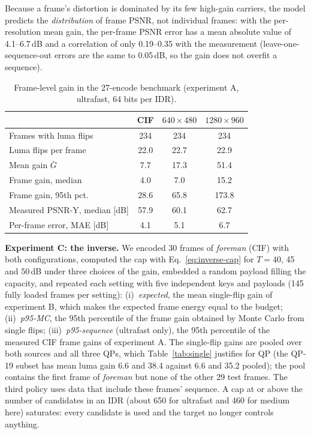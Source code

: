 Because a frame's distortion is dominated by its few high-gain carriers, the model predicts the \emph{distribution} of frame PSNR, not individual frames: with the per-resolution mean gain, the per-frame PSNR error has a mean absolute value of 4.1--6.7\,dB and a correlation of only 0.19--0.35 with the measurement (leave-one-sequence-out errors are the same to 0.05\,dB, so the gain does not overfit a sequence).

\begin{table}[t]
\centering
\caption{Frame-level gain in the 27-encode benchmark (experiment A, ultrafast, 64 bits per IDR).}
\label{tab:sequence}
\setlength{\tabcolsep}{4pt}
\begin{tabular}{@{}lccc@{}}
\toprule
& CIF & $640\times480$ & $1280\times960$ \\
\midrule
Frames with luma flips & 234 & 234 & 234 \\
Luma flips per frame & 22.0 & 22.7 & 22.9 \\
Mean gain $\bar G$ & 7.7 & 17.3 & 51.4 \\
Frame gain, median & 4.0 & 7.0 & 15.2 \\
Frame gain, 95th pct. & 28.6 & 65.8 & 173.8 \\
Measured PSNR-Y, median [dB] & 57.9 & 60.1 & 62.7 \\
Per-frame error, MAE [dB] & 4.1 & 5.1 & 6.7 \\
\bottomrule
\end{tabular}
\end{table}

\textbf{Experiment C: the inverse.} We encoded 30 frames of \emph{foreman} (CIF) with both configurations, computed the cap with Eq.~\eqref{eq:inverse-cap} for $T=40$, 45 and 50\,dB under three choices of the gain, embedded a random payload filling the capacity, and repeated each setting with five independent keys and payloads (145 fully loaded frames per setting): (i)~\emph{expected}, the mean single-flip gain of experiment B, which makes the expected frame energy equal to the budget; (ii)~\emph{p95-MC}, the 95th percentile of the frame gain obtained by Monte Carlo from single flips; (iii)~\emph{p95-sequence} (ultrafast only), the 95th percentile of the measured CIF frame gains of experiment A. The single-flip gains are pooled over both sources and all three QPs, which Table~\ref{tab:single} justifies for QP (the QP-19 subset has mean luma gain 6.6 and 38.4 against 6.6 and 35.2 pooled); the pool contains the first frame of \emph{foreman} but none of the other 29 test frames. The third policy uses data that include these frames' sequence. A cap at or above the number of candidates in an IDR (about 650 for ultrafast and 460 for medium here) saturates: every candidate is used and the target no longer controls anything.

